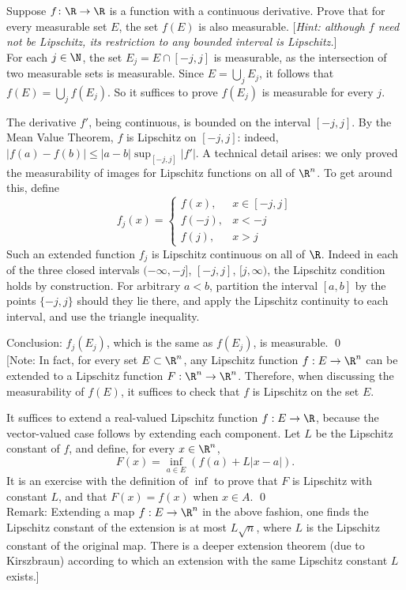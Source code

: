 \begin{hwsol}
Suppose $f \colon \R \to \R$ is a function with a continuous derivative. Prove that for every measurable set $E$, the set $f(E)$ is also measurable. [\emph{Hint: although $f$ need not be Lipschitz, its restriction to any bounded interval is Lipschitz.}] \\

\pf For each $j \in \N$, the set $E_j= E \cap [-j, j]$ is measurable, as the intersection of two measurable sets is measurable. Since $E= \bigcup_j E_j$, it follows that  $f(E)=\bigcup_j f(E_j)$. So it suffices to prove $f(E_j)$ is measurable for every $j$.

The derivative $f'$, being continuous, is bounded on the interval $[-j, j]$. By the Mean Value Theorem, $f$ is Lipschitz on $[-j, j]$: indeed, $|f(a)-f(b)| \leq |a-b| \sup_{[-j, j]} |f'|$. A technical detail arises: we only proved the measurability of images for Lipschitz functions on all of $\R^n$. To get around this, define 
        \[
        f_j(x)= 
        \begin{cases} 
        f(x),  & x \in [-j, j] \\ 
        f(-j), & x< -j  \\ 
        f(j),  & x> j
        \end{cases}
        \]
Such an extended function $f_j$ is Lipschitz continuous on all of $\R$. Indeed in each of the three closed intervals $(-\infty, -j]$, $[-j, j]$, $[j, \infty)$, the Lipschitz condition holds by construction. For arbitrary $a<b$, partition the interval $[a, b]$ by the points $\{-j, j\}$ should they lie there, and apply the Lipschitz continuity to each interval, and use the triangle inequality.  

Conclusion: $f_j(E_j)$, which is the same as $f(E_j)$, is measurable. \qed \\

[Note: In fact, for every set $E \subset \R^n$, any Lipschitz function $f: E \to \R^n$ can be extended to a Lipschitz function $F: \R^n \to \R^n$. Therefore, when discussing the measurability of $f(E)$, it suffices to check that $f$ is Lipschitz on the set $E$. 

\pfsk It suffices to extend a real-valued Lipschitz function $f: E \to \R$, because the vector-valued case follows by extending each component. Let $L$ be the Lipschitz constant of $f$, and define, for every $x \in \R^n$,
        \[
        F(x)= \inf_{a\in E} (f(a) + L|x-a|).
        \]
It is an exercise with the definition of $\inf$ to prove that $F$ is Lipschitz with constant $L$, and that $F(x)=f(x)$ when $x \in A$. \qed \\

\noindent Remark: Extending a map $f: E \to \R^n$ in the above fashion, one finds the Lipschitz constant of the extension is at most $L \sqrt{n}$, where $L$ is the Lipschitz constant of the original map. There is a deeper extension theorem (due to Kirszbraun) according to which an extension with the same Lipschitz constant $L$ exists.]
\end{hwsol}


